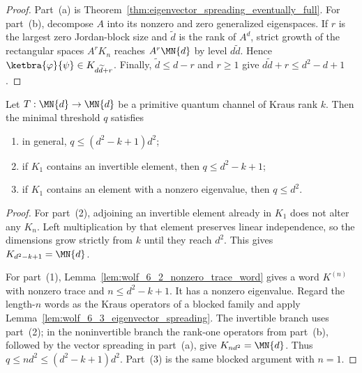 \begin{proof}\leanok
    Part~(a) is Theorem~\ref{thm:eigenvector_spreading_eventually_full}.
    For part~(b), decompose $A$ into its nonzero and zero generalized
    eigenspaces. If $r$ is the largest zero Jordan-block size and
    $\widetilde d$ is the rank of $A^d$, strict growth of the rectangular
    spaces $A^rK_n$ reaches $A^r\MN{d}$ by level $d\widetilde d$.
    Hence $\ketbra{\varphi}{\psi}\in K_{d\widetilde d+r}$. Finally,
    $\widetilde d\leq d-r$ and $r\geq1$ give
    $d\widetilde d+r\leq d^2-d+1$.
\end{proof}

\begin{theorem}
    \label{thm:wolf_6_9_quantum_wielandt}
    \leanok
    Let $T:\MN{d}\to\MN{d}$ be a primitive quantum channel of Kraus rank
    $k$. Then the minimal threshold $q$ satisfies
    \begin{enumerate}
        \item in general, $q\leq(d^2-k+1)d^2$;
        \item if $K_1$ contains an invertible element, then
            $q\leq d^2-k+1$;
        \item if $K_1$ contains an element with a nonzero eigenvalue, then
            $q\leq d^2$.
    \end{enumerate}
\end{theorem}

\begin{proof}\leanok
    For part~(2), adjoining an invertible element already in $K_1$ does not
    alter any $K_n$. Left multiplication by that element preserves linear
    independence, so the dimensions grow strictly from $k$ until they reach
    $d^2$. This gives $K_{d^2-k+1}=\MN{d}$.

    For part~(1), Lemma~\ref{lem:wolf_6_2_nonzero_trace_word} gives a word
    $K^{(n)}$ with nonzero trace and $n\leq d^2-k+1$. It has a nonzero
    eigenvalue. Regard the length-$n$ words as the Kraus operators of a
    blocked family and apply Lemma~\ref{lem:wolf_6_3_eigenvector_spreading}.
    The invertible branch uses part~(2); in the noninvertible branch the
    rank-one operators from part~(b), followed by the vector spreading in
    part~(a), give $K_{nd^2}=\MN{d}$. Thus
    $q\leq nd^2\leq(d^2-k+1)d^2$. Part~(3) is the same blocked argument with
    $n=1$.
\end{proof}

